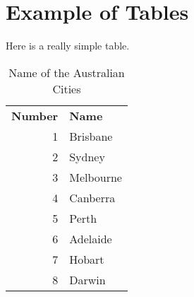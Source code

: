 \chapter{Example of Tables}

Here is a really simple table.


\begin{table}[h]
\caption{Name of the Australian Cities}
\begin{center}
\begin{tabular}{rl}
\textbf{Number}& \textbf {Name}\\
      1& Brisbane\\
      2& Sydney\\
      3& Melbourne\\
      4& Canberra\\
      5& Perth\\
      6& Adelaide\\
      7& Hobart\\
      8& Darwin\\
\end{tabular}
\end{center}
\label{Tag:Australian City}
\end{table}